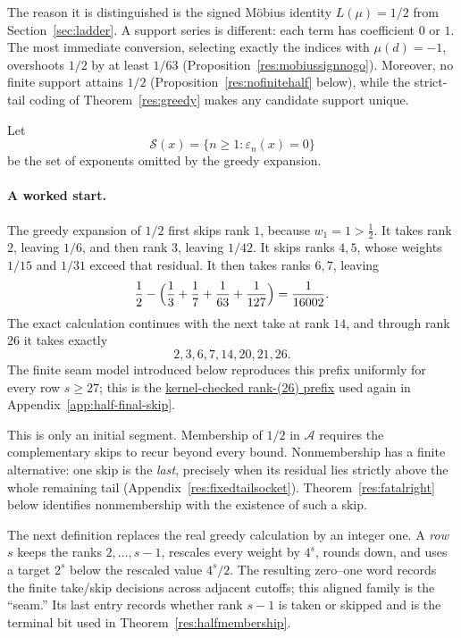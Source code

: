 \documentclass[11pt]{article}
\newcommand{\commit}{99f4bf47422abbd8757cbb22b50ba079d764d3a7}
\newcommand{\repobase}{https://github.com/wcook04/plectis-erdos/blob/\commit}
\newcommand{\PK}{Erdos249257}
\newcommand{\lword}[4]{\href{\repobase/\PK/#1\#L#2}{#4}}
\theoremstyle{definition}
\theoremstyle{remark}
\begin{document}
The reason it is distinguished is the signed M\"obius identity
\(L(\mu)=1/2\) from Section~\ref{sec:ladder}.  A support series is different:
each term has coefficient \(0\) or \(1\).  The most immediate conversion,
selecting exactly the indices with \(\mu(d)=-1\), overshoots \(1/2\) by at
least \(1/63\) (Proposition~\ref{res:mobiussignnogo}).  Moreover, no finite
support attains \(1/2\) (Proposition~\ref{res:nofinitehalf} below), while the
strict-tail coding of Theorem~\ref{res:greedy} makes any candidate support
unique.

Let
\[
 \mathcal S(x)=\{n\geq1:\varepsilon_n(x)=0\}
\]
be the set of exponents omitted by the greedy expansion.

\paragraph{A worked start.}
The greedy expansion of \(1/2\) first skips rank \(1\), because
\(w_1=1>\tfrac12\).  It takes rank \(2\), leaving \(1/6\), and then rank
\(3\), leaving \(1/42\).  It skips ranks \(4,5\), whose weights \(1/15\)
and \(1/31\) exceed that residual.  It then takes ranks \(6,7\), leaving
\[
 \frac12-\Bigl(\frac13+\frac17+\frac1{63}+\frac1{127}\Bigr)
 =\frac1{16002}.
\]
The exact calculation continues with the next take at rank \(14\), and through
rank \(26\) it takes exactly
\[
 2,3,6,7,14,20,21,26.
\]
The finite seam model introduced below reproduces this prefix uniformly for
every row \(s\geq27\); this is the
\lword{HalfFinalMiddlePhaseSieve.lean}{899}{seamGreedyBits_head2367_14_20_21_26}{kernel-checked rank-(26) prefix}
used again in Appendix~\ref{app:half-final-skip}.

This is only an initial segment.  Membership of \(1/2\) in \(\mathcal A\)
requires the complementary skips to recur beyond every bound.  Nonmembership
has a finite alternative: one skip is the \emph{last}, precisely when its
residual lies strictly above the whole remaining tail
(Appendix~\ref{res:fixedtailsocket}).  Theorem~\ref{res:fatalright} below
identifies nonmembership with the existence of such a skip.

The next definition replaces the real greedy calculation by an integer one.
A \emph{row} \(s\) keeps the ranks \(2,\ldots,s-1\), rescales every weight by
\(4^s\), rounds down, and uses a target \(2^s\) below the rescaled value
\(4^s/2\).  The resulting zero--one word records the finite take/skip
decisions across adjacent cutoffs; this aligned family is the ``seam.''  Its
last entry records whether rank \(s-1\) is taken or skipped and is the terminal
bit used in Theorem~\ref{res:halfmembership}.
\end{document}
